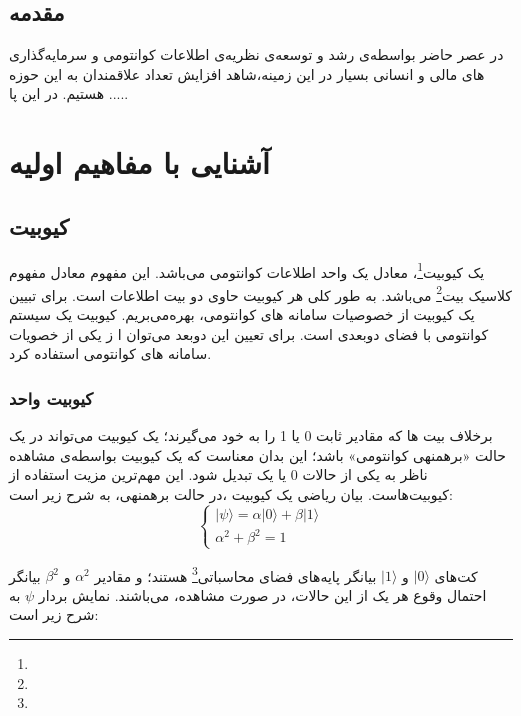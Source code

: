 \documentclass{book}
\begin{document}
\tableofcontents
\section{مقدمه}	
در عصر حاضر بواسطه‌ی رشد و توسعه‌ی نظریه‌ی اطلاعات کوانتومی و سرمایه‌گذاری های مالی و انسانی بسیار در این زمینه،‌شاهد افزایش تعداد علاقمندان به این حوزه هستیم. در این پا .....

\chapter{آشنایی با مفاهیم اولیه}
\section{کیوبیت}

یک کیوبیت\footnote{}، معادل یک واحد اطلاعات کوانتومی می‌باشد. این مفهوم معادل مفهوم کلاسیک بیت\footnote{} می‌باشد. به طور کلی هر کیوبیت حاوی دو بیت اطلاعات است. برای تبیین یک کیوبیت از خصوصیات سامانه های کوانتومی، بهره‌می‌بریم. کیوبیت یک سیستم کوانتومی با فضای دوبعدی است. برای تعیین این دوبعد می‌توان ا ز یکی از خصویات سامانه های کوانتومی استفاده کرد. 
\subsection{کیوبیت‌ واحد}
برخلاف بیت ها که مقادیر ثابت 0 یا 1 را به خود می‌گیرند؛ یک کیوبیت می‌تواند در یک حالت «برهمنهی کوانتومی» باشد؛ این بدان معناست که یک کیوبیت بواسطه‌ی مشاهده ناظر به یکی از حالات 0 یا یک تبدیل شود. این مهم‌ترین مزیت استفاده از کیوبیت‌هاست. بیان ریاضی یک کیوبیت ،در حالت برهمنهی، به شرح زیر است:
\vspace{2cm}
$$
\left\{
\begin{array}{ll}
	  \vert \psi \rangle = \alpha\vert 0 \rangle + \beta\vert 1 \rangle \\
	  \alpha^2 + \beta^2 = 1
\end{array}
\right.
$$
\vspace{2cm}

\newpage
کت‌های $\vert 0 \rangle$ و $\vert 1 \rangle$ بیانگر پایه‌های فضای 
محاسباتی\footnote{} هستند؛ و مقادیر $\alpha^2$ و $\beta^2$ بیانگر احتمال وقوع هر یک از این حالات، در صورت مشاهده، می‌باشند. نمایش بردار $\psi$ به شرح زیر است:
\begin{center}
\end{center}
\end{document}
